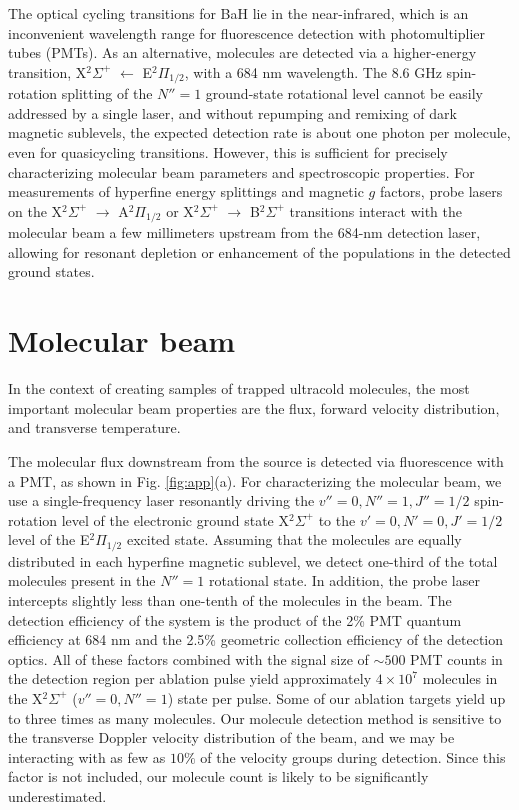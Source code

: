 \documentclass[amsmath,amssymb,aps,twocolumn,longbibliography,notitlepage]{revtex4-1}
\begin{document}
The optical cycling transitions for BaH lie in the near-infrared, which is an inconvenient wavelength range for fluorescence detection with photomultiplier tubes (PMTs).  As an alternative, molecules are detected via a higher-energy transition, X$^2\Sigma^+$ $\leftarrow$ E$^2\Pi_{1/2}$, with a 684 nm wavelength.  The 8.6 GHz spin-rotation splitting of the $N''=1$ ground-state rotational level \cite{ZelevinskyTaralloPRA16_BaH} cannot be easily addressed by a single laser, and without repumping and remixing of dark magnetic sublevels, the expected detection rate is about one photon per molecule, even for quasicycling transitions.  However, this is sufficient for precisely characterizing molecular beam parameters and spectroscopic properties.  For measurements of hyperfine energy splittings and magnetic $g$ factors, probe lasers on the X$^2\Sigma^+$ $\rightarrow$ A$^2\Pi_{1/2}$ or X$^2\Sigma^+$ $\rightarrow$ B$^2\Sigma^+$ transitions interact with the molecular beam a few millimeters upstream from the 684-nm detection laser, allowing for resonant depletion or enhancement of the populations in the detected ground states.

\section{Molecular beam}
\label{sec:Beam}

In the context of creating samples of trapped ultracold molecules, the most important molecular beam properties are the flux, forward velocity distribution, and transverse temperature.

The molecular flux downstream from the source is detected via fluorescence with a PMT, as shown in Fig. \ref{fig:app}(a).  For characterizing the molecular beam, we use a single-frequency laser resonantly driving the $v''=0,N''=1,J''=1/2$ spin-rotation level of the electronic ground state X$^2\Sigma^+$ to the $v'=0,N'=0,J'=1/2$ level of the E$^2\Pi_{1/2}$ excited state. Assuming that the molecules are equally distributed in each hyperfine magnetic sublevel, we detect one-third of the total molecules present in the $N''=1$ rotational state.  In addition, the probe laser intercepts slightly less than one-tenth of the molecules in the beam.  The detection efficiency of the system is the product of the 2\% PMT quantum efficiency at 684 nm and the 2.5\% geometric collection efficiency of the detection optics.  All of these factors combined with the signal size of $\sim500$ PMT counts in the detection region per ablation pulse yield approximately $4\times10^7$ molecules in the X$^2\Sigma^+$ ($v''=0,N''=1$) state per pulse.  Some of our ablation targets yield up to three times as many molecules.  Our molecule detection method is sensitive to the transverse Doppler velocity distribution of the beam, and we may be interacting with as few as $10\%$ of the velocity groups during detection.  Since this factor is not included, our molecule count is likely to be significantly underestimated.
\end{document}
